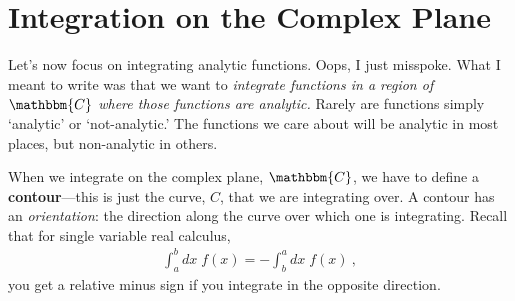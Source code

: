 \documentclass[
  11pt,
	colorful,
	raggedright,
]{tufte-style-thesis-flip}
\begin{document}
\section{Integration on the Complex Plane}

Let's now focus on integrating analytic functions. Oops, I just misspoke. What I meant to write was that we want to \emph{integrate functions in a region of $\mathbbm{C}$ where those functions are analytic.} Rarely are functions simply `analytic' or `not-analytic.' The functions we care about will be analytic in most places, but non-analytic in others. 

When we integrate on the complex plane, $\mathbbm{C}$, we have to define a \textbf{contour}---this is just the curve, $C$, that we are integrating over. A contour has an \emph{orientation}: the direction along the curve over which one is integrating. Recall that for single variable real calculus,
\begin{align}
  \int_a^b dx\; f(x) = - \int_b^a dx\; f(x) \ ,
\end{align}
you get a relative minus sign if you integrate in the opposite direction.
\end{document}
